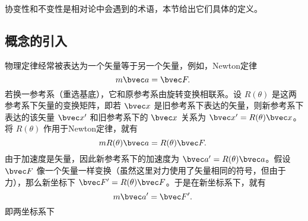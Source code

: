 
协变性和不变性是相对论中会遇到的术语，本节给出它们具体的定义。
\subsection{概念的引入}
物理定律经常被表达为一个矢量等于另一个矢量，例如，Newton定律 
\begin{equation}
m\bvec a=\bvec F.~
\end{equation}
若换一参考系（重选基底），它和原参考系由旋转变换相联系。设 $R(\theta)$ 是这两参考系下矢量的变换矩阵，即若 $\bvec x$ 是旧参考系下表达的矢量，则新参考系下表达的该矢量 $\bvec x'$ 和旧参考系下的 $\bvec x$ 关系为 $\bvec x'=R(\theta)\bvec x$。将 $R(\theta)$ 作用于Newton定律，就有
\begin{equation}
mR(\theta)\bvec a=R(\theta)\bvec F.~
\end{equation}
由于加速度是矢量，因此新参考系下的加速度为 $\bvec a'=R(\theta)\bvec a$。假设 $\bvec F$ 像一个矢量一样变换（虽然这里对力使用了矢量相同的符号，但由于力），那么新坐标下 $\bvec F'=R(\theta)\bvec F$。于是在新坐标系下，就有
\begin{equation}
m\bvec a'=\bvec F'.~
\end{equation}
即两坐标系下










